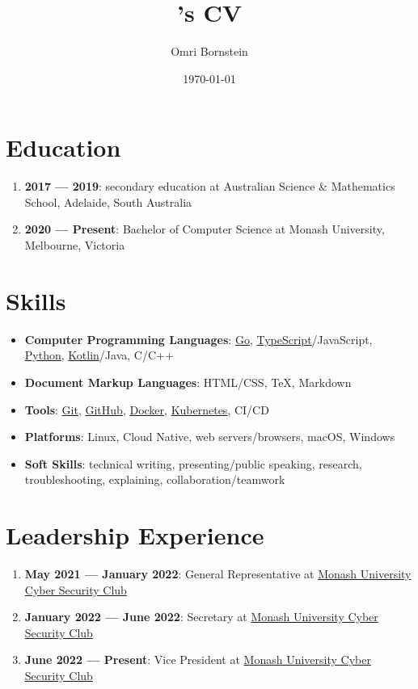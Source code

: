 \documentclass[a4paper, 10pt]{article}
\author{Omri Bornstein}
\title{\theauthor's CV}
\date{\today}
\begin{document}
	\section{Education}
	\begin{enumerate}
		\item \textbf{2017 --- 2019}: secondary education at Australian Science \& Mathematics School, Adelaide, South Australia
		\item \textbf{2020 --- Present}: Bachelor of Computer Science at Monash University, Melbourne, Victoria
	\end{enumerate}

	\section{Skills}
	\begin{itemize}
		\item \textbf{Computer Programming Languages}: \href{https://go.dev}{Go}, \href{https://typescriptlang.org}{TypeScript}/JavaScript, \href{https://python.org}{Python}, \href{https://kotlinlang.org}{Kotlin}/Java, C/C++
		\item \textbf{Document Markup Languages}: HTML/CSS, \TeX, Markdown
		\item \textbf{Tools}: \href{https://git-scm.com}{Git}, \href{https://github.com}{GitHub}, \href{https://www.docker.com}{Docker}, \href{https://kubernetes.io}{Kubernetes}, CI/CD
		\item \textbf{Platforms}: Linux, Cloud Native, web servers/browsers, macOS, Windows
		\item \textbf{Soft Skills}: technical writing, presenting/public speaking, research, troubleshooting, explaining, collaboration/teamwork
	\end{itemize}

	\section{Leadership Experience}
	\begin{enumerate}
		\item \textbf{May 2021 --- January 2022}: General Representative at \href{https://monsec.io/team/}{Monash University Cyber Security Club}
		\item \textbf{January 2022 --- June 2022}: Secretary at \href{https://monsec.io/team/}{Monash University Cyber Security Club}
		\item \textbf{June 2022 --- Present}: Vice President at \href{https://monsec.io/team/}{Monash University Cyber Security Club}
	\end{enumerate}
\end{document}
